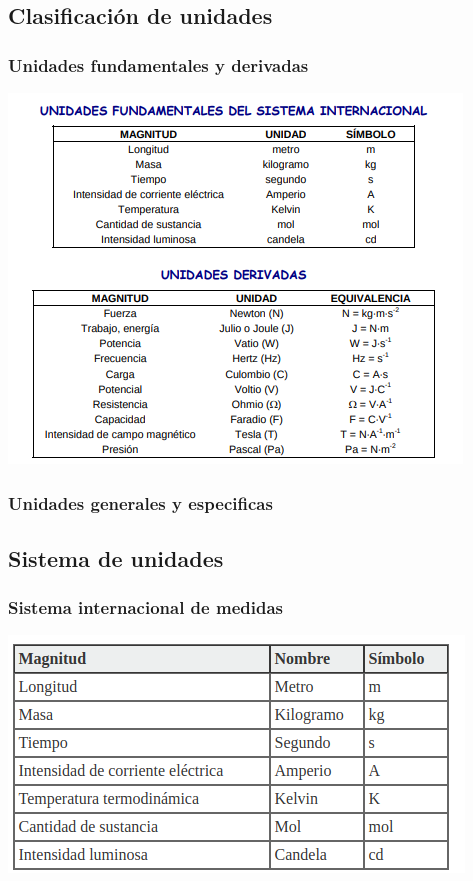 \documentclass[11pt]{article}
\theoremstyle{definition}
\begin{document}
\subsection{Clasificación de unidades}

\subsubsection{Unidades fundamentales y derivadas}

\includegraphics[scale=0.8]{img/unidades-fun_deriv.png}

\subsubsection{Unidades generales y especificas}

\subsection{Sistema de unidades}

\subsubsection{Sistema internacional de medidas}

\includegraphics[scale=0.8]{img/si.png}
\end{document}
